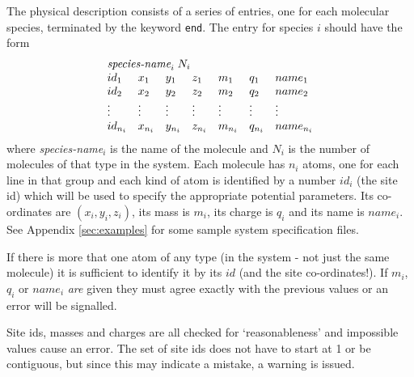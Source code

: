 The physical description consists of a series of entries, one for each
molecular species, terminated by the keyword \verb'end'. The entry
for species $i$ should have the form
\begin{displaymath}
\begin{array}{lllllll}
\multicolumn{7}{l}{\mbox{{\it species-name}}_{i} \; N_{i}}  \\
id_{1} & x_{1} & y_{1} & z_{1}&  m_{1} & q_{1} & name_{1} \\
id_{2} & x_{2} & y_{2} & z_{2}&  m_{2} & q_{2} & name_{2} \\
\vdots & \vdots & \vdots & \vdots & \vdots & \vdots & \vdots \\
id_{n_{i}} & x_{n_{i}} & y_{n_{i}} & z_{n_{i}}& 
m_{n_{i}} & q_{n_{i}} & name_{n_{i}} \\
\end{array}
\end{displaymath}
where {\it species-name}$_{i}$ is the name of the molecule and $N_{i}$
is the number of molecules of that type in the system. Each molecule
has $n_{i}$ atoms, one for each line in that group and each kind of
atom is identified by a number $id_{i}$ (the site id) which will be
used to specify the appropriate potential parameters. Its co-ordinates
are $(x_{i},y_{i},z_{i})$, its mass is $m_{i}$, its charge is $q_{i}$
and its name is $name_{i}$.  See Appendix \ref{sec:examples} for some
sample system specification files.

If there is more that one atom of any type (in the system - not just
the same molecule) it is sufficient to identify it by its $id$ (and
the site co-ordinates!).  If $m_{i}$, $q_{i}$ or $name_{i}$ {\em are}
given they must agree exactly with the previous values or an error
will be signalled.

Site ids, masses and charges are all checked for `reasonableness'
and impossible values cause an error. The set of site ids does not
have to start at 1 or be contiguous, but since this may indicate a
mistake, a warning is issued.

